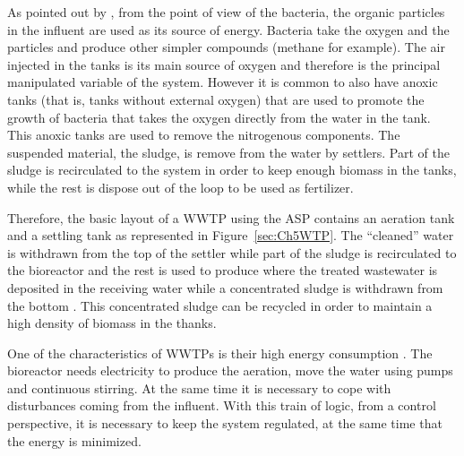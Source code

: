 As pointed out by \citet{Jeppsson1996}, from the point of view of the bacteria, the organic particles in the influent are used as its source of energy. Bacteria take the oxygen and the particles and produce other simpler compounds (methane for example). The air injected in the tanks is its main source of oxygen and therefore is the principal manipulated variable of the system. However it is common to also have anoxic tanks (that is, tanks without external oxygen) that are used to promote the growth of bacteria that takes the oxygen directly from the water in the tank. This anoxic tanks are used to remove the nitrogenous components. The suspended material, the sludge, is remove from the water by settlers. Part of the sludge is recirculated to the system in order to keep enough biomass in the tanks, while the rest is dispose out of the loop to be used as fertilizer.

Therefore, the basic layout of a WWTP using the ASP contains an aeration tank and a settling tank as represented in Figure~\ref{sec:Ch5WTP}. The ``cleaned'' water is withdrawn from the top of the settler while part of the sludge is recirculated to the bioreactor and the rest is used to produce where the treated wastewater is deposited in the receiving water while a concentrated sludge is withdrawn from the bottom \citep{Henze1997}. This concentrated sludge can be recycled in order to maintain a high density of biomass in the thanks.

One of the characteristics of WWTPs is their high energy consumption \citep{Longo2016}. The bioreactor needs electricity to produce the aeration, move the water using pumps and continuous stirring. At the same time it is necessary to cope with disturbances coming from the influent. With this train of logic, from a control perspective, it is necessary to keep the system regulated, at the same time that the energy is minimized.


